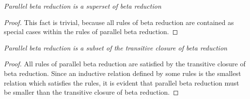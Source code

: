 \begin{lemma}
    \label{ReductionLeParallelReduction}
    \emph{Parallel beta reduction is a superset of beta reduction}

    \begin{proof} This fact is trivial, because all rules of beta reduction are
    contained as special cases within the rules of parallel beta reduction.
    \end{proof}
\end{lemma}



\begin{lemma}
    \label{ParallelReductionLeReductionStar}
    \emph{Parallel beta reduction is a subset of the transitive closure of beta
    reduction}

    \begin{proof}
        All rules of parallel beta reduction are satisfied by the transitive
        closure of beta reduction. Since an inductive relation defined by some
        rules is the smallest relation which satisfies the rules, it is evident
        that parallel beta reduction must be smaller than the transitive closure
        of beta reduction.
    \end{proof}
\end{lemma}







